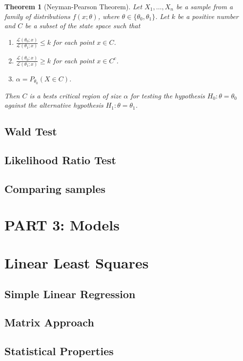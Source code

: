\documentclass[
  openany]{book}
\providecommand{\tightlist}{%
  \setlength{\itemsep}{0pt}\setlength{\parskip}{0pt}}
\newtheorem{theorem}{Theorem}[chapter]
\theoremstyle{definition}
\theoremstyle{definition}
\theoremstyle{definition}
\theoremstyle{definition}
\theoremstyle{remark}
\begin{document}
\begin{theorem}[Neyman-Pearson Theorem]
Let \(X_1, \dots, X_n\) be a sample from a family of distributions \(f(x;\theta)\),
where \(\theta \in \{\theta_0, \theta_1\}\).
Let \(k\) be a positive number and \(C\) be a subset of the state space such that

\begin{enumerate}
\def\labelenumi{\alph{enumi}.}
\tightlist
\item
  \(\displaystyle{\frac{\mathcal{L}(\theta_0;x)}{\mathcal{L}(\theta_1;x)}} \leq k\) for each point \(x\in C\).
\item
  \(\displaystyle\frac{\mathcal{L}(\theta_0;x)}{\mathcal{L}(\theta_1;x)} \geq k\) for each point \(x\in C^c\).
\item
  \(\alpha = P_{\theta_0}(X \in C)\).
\end{enumerate}

Then \(C\) is a bests critical region of size \(\alpha\) for testing the hypothesis
\(H_0: \theta= \theta_0\) against the alternative hypothesis \(H_1: \theta = \theta_1\).
\end{theorem}

\section{Wald Test}\label{wald-test}

\section{Likelihood Ratio Test}\label{likelihood-ratio-test}

\section{Comparing samples}\label{comparing-samples}

\chapter*{PART 3: Models}\label{part-3-models}


\chapter{Linear Least Squares}\label{linear-least-squares}

\section{Simple Linear Regression}\label{simple-linear-regression}

\section{Matrix Approach}\label{matrix-approach}

\section{Statistical Properties}\label{statistical-properties}
\end{document}
